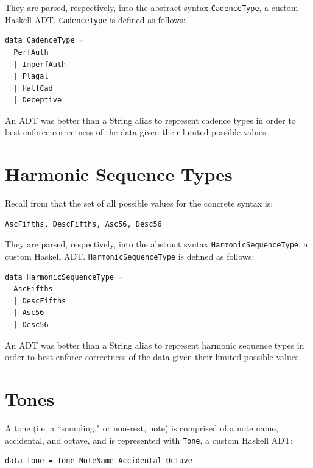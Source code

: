 \documentclass{report}
\newcommand\param[1]{\textttu{<#1>}}
\begin{document}
They are parsed, respectively, into the abstract syntax \verb.CadenceType., a custom Haskell ADT. \verb.CadenceType. is defined as follows:

\begin{verbatim}
data CadenceType = 
  PerfAuth 
  | ImperfAuth
  | Plagal
  | HalfCad
  | Deceptive
\end{verbatim}

An ADT was better than a String alias to represent cadence types in order to best enforce correctness of the data given their limited possible values. 

\section{Harmonic Sequence Types}
Recall from   that the set of all possible values for the concrete syntax \param{HARMSEQTYPE} is:

\begin{verbatim}
AscFifths, DescFifths, Asc56, Desc56
\end{verbatim}

They are parsed, respectively, into the abstract syntax \verb.HarmonicSequenceType., a custom Haskell ADT. \verb.HarmonicSequenceType. is defined as follows:

\begin{verbatim}
data HarmonicSequenceType = 
  AscFifths
  | DescFifths
  | Asc56 
  | Desc56
\end{verbatim}

An ADT was better than a String alias to represent harmonic sequence types in order to best enforce correctness of the data given their limited possible values. 
\section{Tones}
\label{sec:tones}

A tone (i.e. a ``sounding," or non-rest, note) is comprised of a note name, accidental, and octave, and is represented with \verb.Tone., a custom Haskell ADT:

\begin{verbatim}
data Tone = Tone NoteName Accidental Octave 
\end{verbatim}
\end{document}
